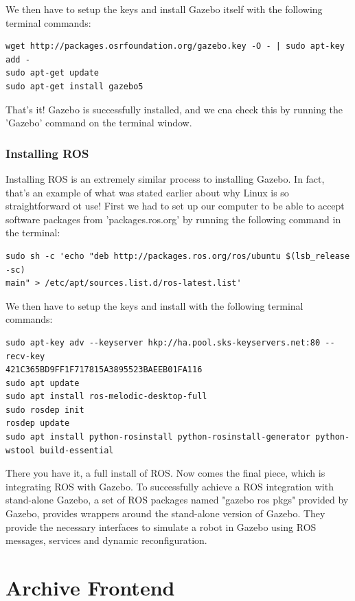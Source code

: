 \documentclass[12pt]{article}
\begin{document}
We then have to setup the keys and install Gazebo itself with the following terminal commands:
\begin{verbatim}
wget http://packages.osrfoundation.org/gazebo.key -O - | sudo apt-key add -
sudo apt-get update
sudo apt-get install gazebo5
\end{verbatim}

That's it! Gazebo is successfully installed, and we cna check this by running the 'Gazebo' command on the terminal window.

\subsubsection{Installing ROS}

Installing ROS is an extremely similar process to installing Gazebo. In fact, that's an example of what was stated earlier about why Linux is so straightforward ot use! First we had to set up our computer to be able to accept software packages from 'packages.ros.org' by running the following command in the terminal:

\begin{verbatim}
sudo sh -c 'echo "deb http://packages.ros.org/ros/ubuntu $(lsb_release -sc)
main" > /etc/apt/sources.list.d/ros-latest.list'
\end{verbatim}

We then have to setup the keys and install with the following terminal commands:

\begin{verbatim}
sudo apt-key adv --keyserver hkp://ha.pool.sks-keyservers.net:80 --recv-key
421C365BD9FF1F717815A3895523BAEEB01FA116
sudo apt update
sudo apt install ros-melodic-desktop-full
sudo rosdep init
rosdep update
sudo apt install python-rosinstall python-rosinstall-generator python-wstool build-essential
\end{verbatim}

There you have it, a full install of ROS. Now comes the final piece, which is integrating ROS with Gazebo. To successfully achieve a ROS integration with stand-alone Gazebo, a set of ROS packages named "gazebo ros pkgs" provided by Gazebo, provides wrappers around the stand-alone version of Gazebo.\cite{GazeboRosIntegration} They provide the necessary interfaces to simulate a robot in Gazebo using ROS messages, services and dynamic reconfiguration.

\newpage

\section{Archive Frontend}
\end{document}
